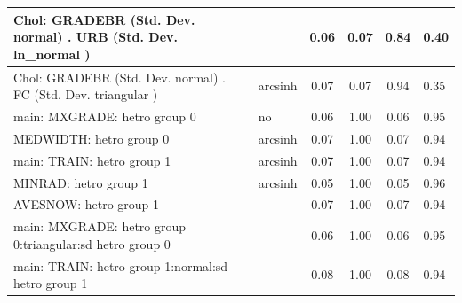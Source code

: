 \begin{table}
\begin{center}
\begin{tabular}{|l|l|c|c|c|l|}
			\hline
			 Chol: GRADEBR (Std. Dev. normal) . URB (Std. Dev.   ln_normal ) &  & 0.06 & 0.07 & 0.84 & 0.40 \\
			\hline
			 Chol: GRADEBR (Std. Dev. normal) . FC (Std. Dev.   triangular ) & arcsinh & 0.07 & 0.07 & 0.94 & 0.35 \\
			\hline
			main: MXGRADE: hetro group 0 & no & 0.06 & 1.00 & 0.06 & 0.95 \\
			\hline
			MEDWIDTH: hetro group 0 & arcsinh & 0.07 & 1.00 & 0.07 & 0.94 \\
			\hline
			main: TRAIN: hetro group 1 & arcsinh & 0.07 & 1.00 & 0.07 & 0.94 \\
			\hline
			MINRAD: hetro group 1 & arcsinh & 0.05 & 1.00 & 0.05 & 0.96 \\
			\hline
			AVESNOW: hetro group 1 &  & 0.07 & 1.00 & 0.07 & 0.94 \\
			\hline
			main: MXGRADE: hetro group 0:triangular:sd  hetro group 0 &  & 0.06 & 1.00 & 0.06 & 0.95 \\
			\hline
			main: TRAIN: hetro group 1:normal:sd  hetro group 1 &  & 0.08 & 1.00 & 0.08 & 0.94 \\
			\hline
		\end{tabular}
	\end{center}
\end{table}